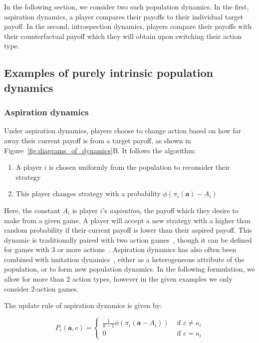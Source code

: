 \documentclass{article}
\begin{document}
In the following section, we consider two such population
dynamics. In the first, aspiration dynamics, a player compares their payoffs to
their individual target payoff. In the second, introspection dynamics, players
compare their payoffs with their counterfactual payoff which they will obtain
upon switching their action type.

\subsection{Examples of purely intrinsic population dynamics}

\subsubsection{Aspiration dynamics}

Under aspiration dynamics, players choose to change action based on how far away
their current payoff is from a target payoff, as shown in
Figure~\ref{fig:diagrams_of_dynamics}B. It
follows the algorithm:

\begin{enumerate}
       \item A player \(i\) is chosen uniformly from the population to
       reconsider their strategy
       \item This player changes strategy with a probability
       \(\phi(\pi_i(\mathbf{a}) - A_i)\)
\end{enumerate}

Here, the constant \(A_i\) is player \(i\)'s \textit{aspiration}, the payoff
which they desire to make from a given game. A player will accept a new strategy
with a higher than random probability if their current payoff is lower than
their aspired payoff. This dynamic is traditionally paired with two action
games~\cite{Du2015AspirationDynamics,du2014aspiration,Zhou2021AspirationDynamics},
though it can be defined for games with 3 or more
actions~\cite{Aspiration3Types}. Aspiration dynamics has also often been
combined with imitation
dynamics~\cite{PhysRevE.102.032120,PhysRevE.94.012124,QUAN2020109634,WANG2023128134},
either as a heterogeneous attribute of the population, or to form new population
dynamics. In the following formulation, we allow for more than 2 action types,
however in the given examples we only consider 2-action games.

The update rule of aspiration dynamics is given by:

\begin{equation}
    P_i(\mathbf{a}, c) = \begin{cases}
    \frac{1}{k-1}\phi(\pi_i(\mathbf{a} - A_i)) & \text{ if } c \neq a_i\\
    0 & \text{ if } c = a_i
    \end{cases}
    \label{eqn:asp_update_rule}
\end{equation}
\end{document}
